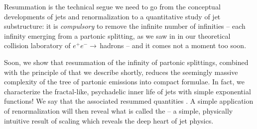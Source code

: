 Resummation is the technical segue we need to go from the conceptual developments of jets and renormalization to a quantitative study of jet substructure:
%
it is \textit{compulsory} to remove the infinite number of infinities -- each infinity emerging from a partonic splitting, as we saw in \Sec{} in our theoretical collision laboratory of \(e^+ e^-\to\,\)hadrons -- and it comes not a moment too soon.
%
%
%

Soon, we show that resummation of the infinity of partonic splittings, combined with the principle of  that we describe shortly, reduces the seemingly massive complexity of the tree of partonic emissions into compact formulae.
%
In fact, we characterize the fractal-like, psychadelic inner life of jets with simple exponential functions!
%
We say that the associated resummed quantities .
%
A simple application of renormalization will then reveal what is called the  -- a simple, physically intuitive result of scaling which reveals the deep heart of jet physics.




